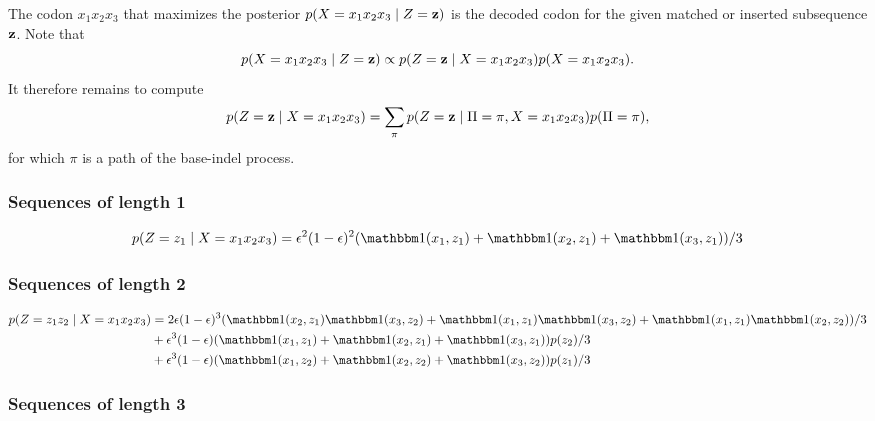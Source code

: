 The codon $x_1x_2x_3$ that maximizes the posterior $p(X=x_1x_2x_3 \;|\; Z=\mathbf{z})$ is the decoded
codon for the given matched or inserted subsequence $\mathbf{z}$. Note that
\begin{equation*}
  p(X=x_1x_2x_3 \;|\; Z=\mathbf{z}) \propto p(Z=\mathbf{z} \;|\; X=x_1x_2x_3) p(X=x_1x_2x_3).
\end{equation*}
It therefore remains to compute
\begin{equation*}
  p(Z=\mathbf{z} \;|\; X=x_1x_2x_3) = \sum_{\pi}p(Z=\mathbf{z} \;|\; \Pi=\pi, X=x_1x_2x_3) p(\Pi=\pi),
\end{equation*}
for which $\pi$ is a path of the base-indel process.

\subsubsection{Sequences of length 1}

\begin{equation*}
  p(Z=z_1 \gv X=x_1x_2x_3) = \e^2(1-\e)^2(\I(x_1, z_1) + \I(x_2, z_1) + \I(x_3, z_1))/3
\end{equation*}

\subsubsection{Sequences of length 2}

\begin{equation*}
  \begin{split}
    p(Z=z_1z_2 \gv X=x_1x_2x_3)
        &= 2\e(1-\e)^3(\I(x_2, z_1)\I(x_3, z_2) + \I(x_1, z_1)\I(x_3, z_2) + \I(x_1, z_1)\I(x_2, z_2))/3\\
        &+ \e^3(1-\e)(\I(x_1, z_1) + \I(x_2, z_1) + \I(x_3, z_1))p(z_2)/3\\
        &+ \e^3(1-\e)(\I(x_1, z_2) + \I(x_2, z_2) + \I(x_3, z_2))p(z_1)/3
  \end{split}
\end{equation*}

\subsubsection{Sequences of length 3}

